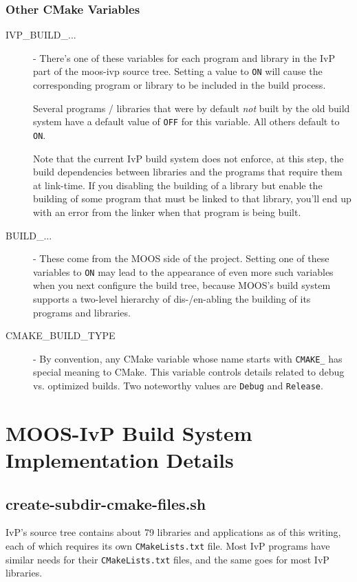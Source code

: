\documentclass[letterpaper,10pt]{article}
\begin{document}
\subsubsection{Other CMake Variables}
\begin{description}
 \item[IVP\_BUILD\_...] - There's one of these variables for each program and library
	in the IvP part of the moos-ivp source tree.  Setting a value to \verb|ON| will
	cause the corresponding program or library to be included in the build process.

	Several programs / libraries that were by default \textit{not} built by the
	old build system have a default value of \verb|OFF| for this variable.  All others
	default to \verb|ON|.

	Note that the current IvP build system does not enforce, at this step, 
	the build dependencies between libraries and the programs that require them at
	link-time.  If you disabling the building of a library but enable the building
	of some program that must be linked to that library, you'll end up with an error
	from the linker when that program is being built.

 \item[BUILD\_...] - These come from the MOOS side of the project.  Setting one of these
	variables to \verb|ON| may lead to the appearance of even more such variables
	when you next configure the build tree, because MOOS's build system supports
	a two-level hierarchy of dis-/en-abling the building of its programs and libraries.

 \item[CMAKE\_BUILD\_TYPE] - By convention, any CMake variable whose name starts with
	\verb|CMAKE_| has special meaning to CMake.  This variable controls details related
	to debug vs. optimized builds.  Two noteworthy values are \verb|Debug| and \verb|Release|.

 \end{description}


\section{MOOS-IvP Build System Implementation Details}

\subsection{create-subdir-cmake-files.sh}
IvP's source tree contains about 79 libraries and applications as of this writing, each of
which requires its own \verb|CMakeLists.txt| file.  Most IvP programs have similar needs
for their \verb|CMakeLists.txt| files, and the same goes for most IvP libraries.
\end{document}
